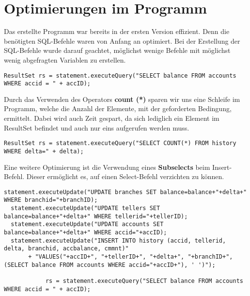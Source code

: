 \section{Optimierungen im Programm}
Das erstellte Programm war bereits in der ersten Version effizient. Denn die
benötigten SQL-Befehle waren von Anfang an optimiert. Bei der Erstellung der
SQL-Befehle wurde darauf geachtet, möglichst wenige Befehle mit möglichst wenig
abgefragten Variablen zu erstellen.
\begin{lstlisting}[caption={Statement der Funktion kontostandTX in
TXHandler.java}] 
   ResultSet rs = statement.executeQuery("SELECT balance FROM accounts WHERE accid = " + accID);
\end{lstlisting}

Durch das Verwenden des Operators \textbf{count (*)} sparen wir uns eine
Schleife im Programm, welche die Anzahl der Elemente, mit der geforderten Bedingung,
ermittelt. Dabei wird auch Zeit gespart, da sich lediglich ein Element im
ResultSet befindet und auch nur eins aufgerufen werden muss. 
\begin{lstlisting}[caption={Statement der Funktion analyseTX in
TXHandler.java}] 
  ResultSet rs = statement.executeQuery("SELECT COUNT(*) FROM history WHERE delta=" + delta);
\end{lstlisting}
 
Eine weitere Optimierung ist die Verwendung eines \textbf{Subselects} beim
Insert-Befehl.
Dieser ermöglicht es, auf einen Select-Befehl verzichten zu können.
\begin{lstlisting}[caption={Statement der Funktion einzahlungTX in
TXHandler.java}] 
  statement.executeUpdate("UPDATE branches SET balance=balance+"+delta+" WHERE branchid="+branchID);
  statement.executeUpdate("UPDATE tellers SET balance=balance+"+delta+" WHERE tellerid="+tellerID);
  statement.executeUpdate("UPDATE accounts SET balance=balance+"+delta+" WHERE accid="+accID);
  statement.executeUpdate("INSERT INTO history (accid, tellerid, delta, branchid, accbalance, cmmnt)"
       + "VALUES("+accID+", "+tellerID+", "+delta+", "+branchID+", (SELECT balance FROM accounts WHERE accid="+accID+"), ' ')");
            
            rs = statement.executeQuery("SELECT balance FROM accounts WHERE accid = " + accID);
\end{lstlisting}


